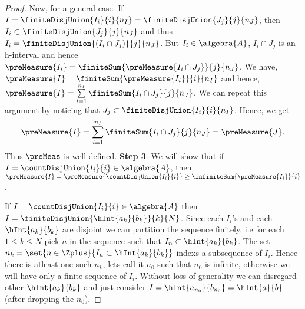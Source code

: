 \begin{proof}
    Now, for a general case. If $I = \finiteDisjUnion{I_i}{i}{n_I} = \finiteDisjUnion{J_j}{j}{n_J}$, 
    then $I_i \subset \finiteDisjUnion{J_j}{j}{n_J}$ and thus 
    $I_i = \finiteDisjUnion{(I_i \cap J_j)}{j}{n_J}$. But $I_i \in \algebra{A}$, $I_i \cap J_j$ 
    is an h-interval and hence $\preMeasure{I_i} = \finiteSum{\preMeasure{I_i \cap J_j}}{j}{n_J}$.
    We have,
    $\preMeasure{I} = \finiteSum{\preMeasure{I_i}}{i}{n_I}$ and hence, 
    $\preMeasure{I} = \sum\limits_{i=1}^{n_I}\finiteSum{I_i \cap J_j}{j}{n_J}$. We can repeat this
    argument by noticing that $J_j \subset \finiteDisjUnion{I_i}{i}{n_I}$. Hence, we get
    \[\preMeasure{I} = \sum\limits_{i=1}^{n_I}\finiteSum{I_i \cap J_j}{j}{n_J} = \preMeasure{J}.\]
    Thus $\preMeas$ is well defined.
    \newline
    \textbf{Step 3}: We will show that if $I = \countDisjUnion{I_i}{i} \in \algebra{A}$, then
    $\preMeasure{I} = \preMeasure{\countDisjUnion{I_i}{i}} \geq \infiniteSum{\preMeasure{I_i}}{i}$.

    If $I = \countDisjUnion{I_i}{i} \in \algebra{A}$ then 
    $I = \finiteDisjUnion{\hInt{a_k}{b_k}}{k}{N}$. Since each $I_i$'s and each $\hInt{a_k}{b_k}$ 
    are disjoint we can partition the sequence finitely, i.e for each $1\leq k \leq N$ pick $n$ in 
    the sequence such that
    $I_{n}\subset \hInt{a_k}{b_k}$. The set $n_k = \set{n \in \Zplus}{I_n \subset \hInt{a_k}{b_k}}$
    indexs a subsequence of $I_i$. Hence there is atleast one such $n_k$, lets call it
    $n_0$ such that $n_0$ is infinite, otherwise we will have only a finite sequence of $I_i$.
    Without loss of generality we can disregard other $\hInt{a_k}{b_k}$ and just consider $I =
    \hInt{a_{n_0}}{b_{n_0}} = \hInt{a}{b}$ (after dropping the $n_0$).
    

\end{proof}
